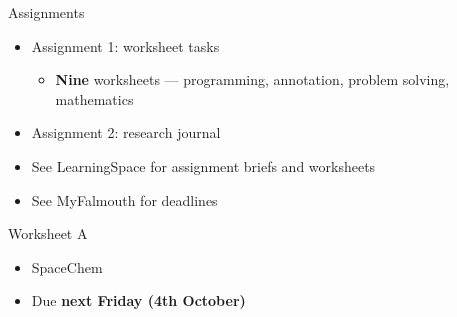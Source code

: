 \begin{frame}{Assignments}
	\begin{itemize}
		\pause\item Assignment 1: worksheet tasks
			\begin{itemize}
				\pause\item \textbf{Nine} worksheets --- programming, annotation, problem solving, mathematics
			\end{itemize}
		\pause\item Assignment 2: research journal
		\pause\item See LearningSpace for assignment briefs and worksheets
		\pause\item See MyFalmouth for deadlines
	\end{itemize}
\end{frame}

\begin{frame}{Worksheet A}
	\begin{itemize}
		\item SpaceChem
		\item Due \textbf{next Friday (4th October)}
	\end{itemize}
\end{frame}
